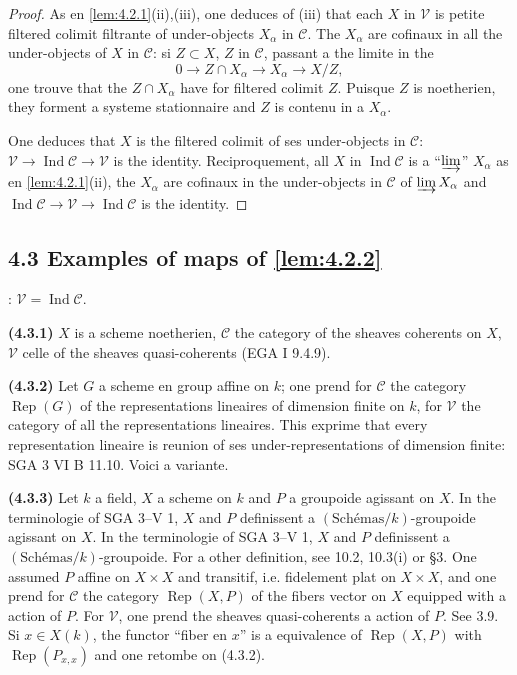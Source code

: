 \documentclass[12pt,a4paper]{article}
\theoremstyle{plain}
\theoremstyle{definition}
\theoremstyle{remark}
\DeclareMathOperator{\Ind}{Ind}
\providecommand{\limind}{\varinjlim}
\providecommand{\Rep}{\operatorname{Rep}}
\begin{document}
\begin{proof}
As en \ref{lem:4.2.1}(ii),(iii), one deduces of (iii) that each $X$ in
$\mathcal{V}$ is petite filtered colimit filtrante of under-objects $X_\alpha$ in
$\mathcal{C}$. The $X_\alpha$ are cofinaux in all the under-objects of $X$ in
$\mathcal{C}$: si $Z \subset X$, $Z$ in $\mathcal{C}$, passant a the limite in the
\[
0 \longrightarrow Z \cap X_\alpha \longrightarrow X_\alpha \longrightarrow X/Z,
\]
one trouve that the $Z \cap X_\alpha$ have for filtered colimit $Z$. Puisque $Z$ is
noetherien, they forment a systeme stationnaire and $Z$ is contenu in a
$X_\alpha$.

One deduces that $X$ is the filtered colimit of ses under-objects in $\mathcal{C}$:
$\mathcal{V} \to \Ind\mathcal{C} \to \mathcal{V}$ is the identity. Reciproquement, all
$X$ in $\Ind\mathcal{C}$ is a ``$\limind$'' $X_\alpha$ as en
\ref{lem:4.2.1}(ii), the $X_\alpha$ are cofinaux in the under-objects in
$\mathcal{C}$ of $\limind X_\alpha$ and $\Ind\mathcal{C} \to \mathcal{V} \to
\Ind\mathcal{C}$ is the identity.
\end{proof}

\subsection*{4.3 Examples of maps of \ref{lem:4.2.2}}:
$\mathcal{V} = \Ind\mathcal{C}$.

\textbf{(4.3.1)} $X$ is a scheme noetherien, $\mathcal{C}$ the category of the
sheaves coherents on $X$, $\mathcal{V}$ celle of the sheaves quasi-coherents (EGA I
9.4.9).

\textbf{(4.3.2)} Let $G$ a scheme en group affine on $k$; one prend for
$\mathcal{C}$ the category $\Rep(G)$ of the representations lineaires of dimension finite
on $k$, for $\mathcal{V}$ the category of all the representations lineaires.
This exprime that every representation lineaire is reunion of ses under-representations
of dimension finite: SGA 3 VI B 11.10. Voici a variante.

\textbf{(4.3.3)} Let $k$ a field, $X$ a scheme on $k$ and $P$ a groupoide agissant on $X$. In the terminologie of SGA 3--V 1, $X$ and $P$ definissent a
$(\text{Sch\'emas}/k)$-groupoide agissant on $X$. In the terminologie of SGA 3--V 1, $X$ and $P$ definissent a
$(\text{Sch\'emas}/k)$-groupoide. For a other definition, see 10.2, 10.3(i) or
\cite{D4} \S3. One assumed $P$ affine on $X \times X$ and transitif, i.e. fidelement
plat on $X \times X$, and one prend for $\mathcal{C}$ the category $\Rep(X,P)$ of the
fibers vector on $X$ equipped with a action of $P$. For $\mathcal{V}$, one prend the
sheaves quasi-coherents a action of $P$. See \cite{D4} 3.9. Si $x \in X(k)$, the
functor ``fiber en $x$'' is a equivalence of $\Rep(X,P)$ with $\Rep(P_{x,x})$
and one retombe on (4.3.2).
\end{document}
